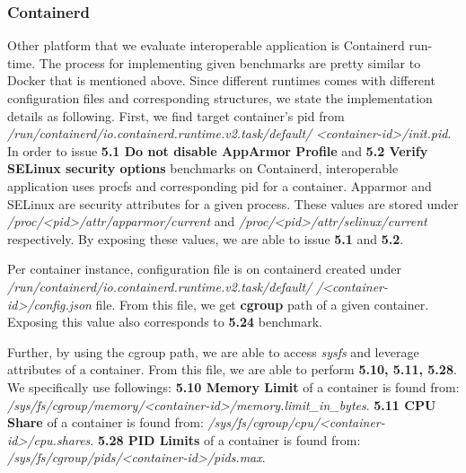\subsubsection*{Containerd}


Other platform that we evaluate interoperable application is Containerd  run-time. The process for implementing given benchmarks are pretty similar to Docker that is
mentioned above. Since different runtimes comes with different configuration files and corresponding structures, we state the implementation details as following.
First, we find target container's pid from \textit{/run/containerd/io.containerd.runtime.v2.task/default/}
\textit{<container-id>/init.pid}.
In order to issue \textbf{5.1 Do not disable AppArmor Profile} and \textbf{5.2 Verify SELinux security options} benchmarks on Containerd, interoperable application
uses procfs and corresponding pid for a container. Apparmor and SELinux are security attributes for a given process. 
These values are stored under \textit{/proc/<pid>/attr/apparmor/current} and \textit{/proc/<pid>/attr/selinux/current} respectively. 
By exposing these values, we are able to issue \textbf{5.1} and \textbf{5.2}.

Per container instance, configuration file is on containerd created under \textit{/run/containerd/io.containerd.runtime.v2.task/default/} \textit{/<container-id>/config.json} file.
From this file, we get \textbf{cgroup} path of a given container. Exposing this value also corresponds to \textbf{5.24} benchmark.

Further, by using the cgroup path, we are able to access \textit{sysfs} and leverage attributes of a container. 
 From this file, we are able to perform \textbf{5.10, 5.11, 5.28}. 
 We specifically use followings:  \textbf{5.10 Memory Limit} of a container is found from: \textit{/sys/fs/cgroup/memory/<container-id>/memory.limit\_in\_bytes}.
\textbf{5.11 CPU Share} of a container is found from: \textit{/sys/fs/cgroup/cpu/<container-id>/cpu.shares}.
\textbf{5.28 PID Limits} of a container is found from: \textit{/sys/fs/cgroup/pids/<container-id>/pids.max}.
 